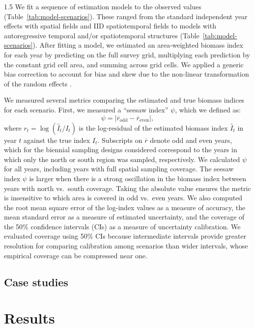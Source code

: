 \documentclass[11pt]{article}
\begin{document}
\begin{spacing}{1.5}
We fit a sequence of estimation models to the observed values (Table~\ref{tab:model-scenarios}).
These ranged from the standard independent year effects with spatial fields and IID spatiotemporal fields to models with autoregressive temporal and/or spatiotemporal structures (Table~\ref{tab:model-scenarios}).
After fitting a model, we estimated an area-weighted biomass index for each year by predicting on the full survey grid, multiplying each prediction by the constant grid cell area, and summing across grid cells.
We applied a generic bias correction to account for bias and skew due to the non-linear transformation of the random effects \citep{thorsonImplementingGeneric2016}.

We measured several metrics comparing the estimated and true biomass indices for each scenario.
First, we measured a ``seesaw index'' $\psi$, which we defined as:
\begin{equation}
\psi = \left\lvert \overline{r}_{\text{odd}} - \overline{r}_{\text{even}} \right\rvert,
\label{eq:seesaw}
\end{equation}
\noindent
where $r_t = \log(\hat{I}_t / I_t)$ is the log-residual of the estimated biomass index $\hat{I}_t$ in year $t$ against the true index $I_t$.
Subscripts on $\overline{r}$ denote odd and even years, which for the biennial sampling designs considered correspond to the years in which only the north or south region was sampled, respectively.
We calculated $\psi$ for all years, including years with full spatial sampling coverage.
The seesaw index $\psi$ is larger when there is a strong oscillation in the biomass index between years with north vs.\ south coverage.
Taking the absolute value ensures the metric is insensitive to which area is covered in odd vs.\ even years.
We also computed the root mean square error of the log-index values as a measure of accuracy, the mean standard error as a measure of estimated uncertainty, and the coverage of the 50\% confidence intervals (CIs) as a measure of uncertainty calibration.
We evaluated coverage using 50\% CIs because intermediate intervals provide greater resolution for comparing calibration among scenarios than wider intervals, whose empirical coverage can be compressed near one.

\subsection*{Case studies}

\section*{Results}


\end{spacing}
\end{document}
